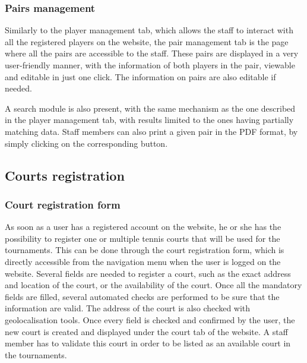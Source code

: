 \subsubsection{Pairs management}
\label{subs:Pairs management}


Similarly to the player management tab, which allows the staff to interact with
all the registered players on the website, the pair management tab is the page
where all the pairs are accessible to the staff. These pairs are displayed in a
very user-friendly manner, with the information of both players in the
pair, viewable and editable in just one click. The information on pairs are
also editable if needed. \newline

A search module is also present, with the same mechanism as the one described
in the player management tab, with results limited to the ones having partially
matching data. Staff members can also print a given pair in the PDF format,
by simply clicking on the corresponding button.

\subsection{Courts registration}
\label{sub:Courts registration}

\subsubsection{Court registration form}
\label{subs:Court registration form}


As soon as a user has a registered account on the website,
he or she has the possibility to register one or multiple tennis courts that
will be used for the tournaments. This can be done through the court
registration form, which is directly accessible from the navigation menu
when the user is logged on the website. Several fields are needed to register
a court, such as the exact address and location of the court, or the
availability of the court. Once all the mandatory fields are filled, several
automated checks are performed to be sure that the information are valid.
The address of the court is also checked with geolocalisation tools.
Once every field is checked and confirmed by the user, the new court is
created and displayed under the court tab of the website. A staff member
has to validate this court in order to be listed as an available court
in the tournaments.

